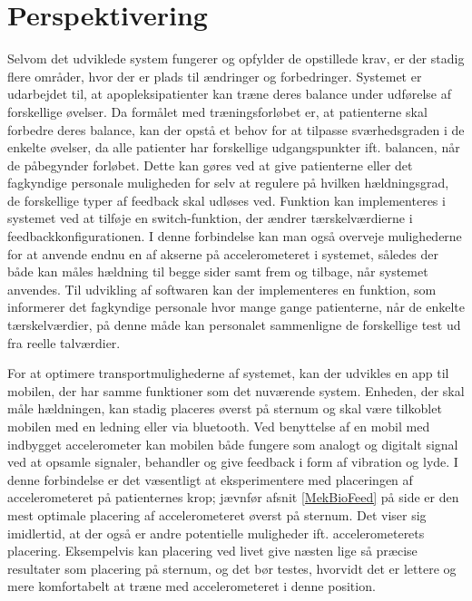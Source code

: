 \section{Perspektivering}
Selvom det udviklede system fungerer og opfylder de opstillede krav, er der stadig flere områder, hvor der er plads til ændringer og forbedringer. 
Systemet er udarbejdet til, at apopleksipatienter kan træne deres balance under udførelse af forskellige øvelser. Da formålet med træningsforløbet er, at patienterne skal forbedre deres balance, kan der opstå et behov for at tilpasse sværhedsgraden i de enkelte øvelser, da alle patienter har forskellige udgangspunkter ift. balancen, når de påbegynder forløbet. Dette kan gøres ved at give patienterne eller det fagkyndige personale muligheden for selv at regulere på hvilken hældningsgrad, de forskellige typer af feedback skal udløses ved. Funktion kan implementeres i systemet ved at tilføje en switch-funktion, der ændrer tærskelværdierne i feedbackkonfigurationen. %
I denne forbindelse kan man også overveje mulighederne for at anvende endnu en af akserne på accelerometeret i systemet, således der både kan måles hældning til begge sider samt frem og tilbage, når systemet anvendes. Til udvikling af softwaren kan der implementeres en funktion, som informerer det fagkyndige personale hvor mange gange patienterne, når de enkelte tærskelværdier, på denne måde kan personalet sammenligne de forskellige test ud fra reelle talværdier. 

For at optimere transportmulighederne af systemet, kan der udvikles en app til mobilen, der har samme funktioner som det nuværende system. Enheden, der skal måle hældningen, kan stadig placeres øverst på sternum og skal være tilkoblet mobilen med en ledning eller via bluetooth. Ved benyttelse af en mobil med indbygget accelerometer kan mobilen både fungere som analogt og digitalt signal ved at opsamle signaler, behandler og give feedback i form af vibration og lyde. %
I denne forbindelse er det væsentligt at eksperimentere med placeringen af accelerometeret på patienternes krop; jævnfør afsnit \ref{MekBioFeed} på side \pageref{MekBioFeed} er den mest optimale placering af accelerometeret øverst på sternum. Det viser sig imidlertid, at der også er andre potentielle muligheder ift. accelerometerets placering. Eksempelvis kan placering ved livet give næsten lige så præcise resultater som placering på sternum, og det bør testes, hvorvidt det er lettere og mere komfortabelt at træne med accelerometeret i denne position\cite{Gjoreski2011}.

